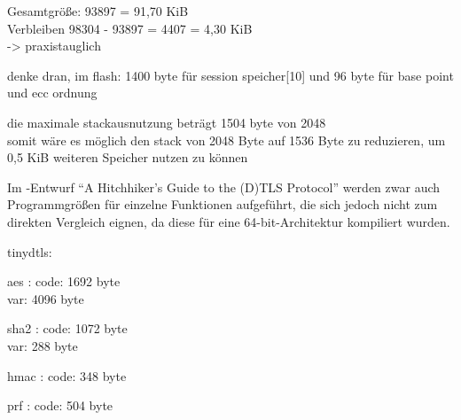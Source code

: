 Gesamtgröße: 93897 = 91,70 KiB\\
Verbleiben   98304 - 93897 = 4407 = 4,30 KiB\\
-> praxistauglich

denke dran, im flash: 1400 byte für session speicher[10] und 96 byte für base point und ecc ordnung

die maximale stackausnutzung beträgt 1504 byte von 2048\\
somit wäre es möglich den stack von 2048 Byte auf 1536 Byte zu reduzieren, um 0,5 KiB weiteren Speicher nutzen zu können

Im -Entwurf "`A Hitchhiker's Guide to the (D)TLS Protocol"' \cite{draftmintls} werden zwar auch Programmgrößen für einzelne
Funktionen aufgeführt, die sich jedoch nicht zum direkten Vergleich eignen, da diese für eine 64-bit-Architektur kompiliert wurden.

tinydtls:

aes :   code: 1692 byte\\
         var: 4096 byte

sha2 :  code: 1072 byte\\
         var: 288 byte

hmac :  code: 348 byte

prf :   code: 504 byte